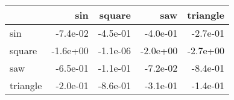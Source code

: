 \begin{tabular}{lrrrr}
\toprule
{} &      sin &   square &      saw &  triangle \\
\midrule
sin      & -7.4e-02 & -4.5e-01 & -4.0e-01 &  -2.7e-01 \\
square   & -1.6e+00 & -1.1e-06 & -2.0e+00 &  -2.7e+00 \\
saw      & -6.5e-01 & -1.1e-01 & -7.2e-02 &  -8.4e-01 \\
triangle & -2.0e-01 & -8.6e-01 & -3.1e-01 &  -1.4e-01 \\
\bottomrule
\end{tabular}
